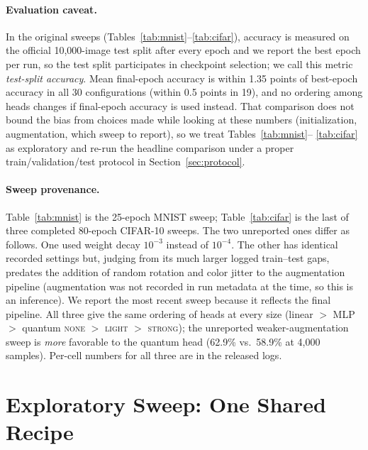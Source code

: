 \documentclass[10pt]{article}
\begin{document}
\paragraph{Evaluation caveat.}
In the original sweeps (Tables~\ref{tab:mnist}--\ref{tab:cifar}), accuracy is
measured on the official 10{,}000-image test split after every epoch and we
report the best epoch per run, so the test split participates in checkpoint
selection; we call this metric \emph{test-split accuracy}. Mean final-epoch
accuracy is within 1.35 points of best-epoch accuracy in all 30
configurations (within 0.5 points in 19), and no ordering among heads changes
if final-epoch accuracy is used instead. That comparison does not bound the
bias from choices made while looking at these numbers (initialization,
augmentation, which sweep to report), so we treat Tables~\ref{tab:mnist}--%
\ref{tab:cifar} as exploratory and re-run the headline comparison under a
proper train/validation/test protocol in Section~\ref{sec:protocol}.

\paragraph{Sweep provenance.}
Table~\ref{tab:mnist} is the 25-epoch MNIST sweep; Table~\ref{tab:cifar} is the
last of three completed 80-epoch CIFAR-10 sweeps. The two unreported ones
differ as follows. One used weight
decay $10^{-3}$ instead of $10^{-4}$. The other has identical recorded settings
but, judging from its much larger logged train--test gaps, predates the
addition of random rotation and color jitter to the augmentation pipeline
(augmentation was not recorded in run metadata at the time, so this is an
inference). We report the most recent sweep because it reflects the final
pipeline. All three give the same ordering of heads at every size (linear $>$
MLP $>$ quantum \textsc{none} $>$ \textsc{light} $>$ \textsc{strong}); the
unreported weaker-augmentation sweep is \emph{more} favorable to the quantum
head (62.9\% vs.\ 58.9\% at 4{,}000 samples). Per-cell numbers for all three are
in the released logs.

\section{Exploratory Sweep: One Shared Recipe}
\label{sec:results}
\end{document}

